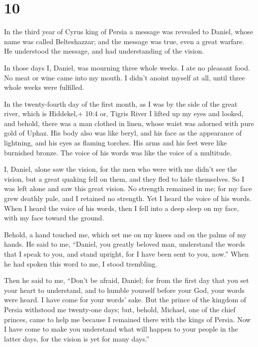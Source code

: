 \hypertarget{section-9}{%
\section{10}\label{section-9}}

 In the third year of Cyrus king of Persia a message was
revealed to Daniel, whose name was called Belteshazzar; and the message
was true, even a great warfare. He understood the message, and had
understanding of the vision.

 In those days I, Daniel, was mourning three whole weeks.
 I ate no pleasant food. No meat or wine came into my mouth.
I didn't anoint myself at all, until three whole weeks were fulfilled.

 In the twenty-fourth day of the first month, as I was by
the side of the great river, which is Hiddekel,+ 10:4 or, Tigris River
 I lifted up my eyes and looked, and behold, there was a man
clothed in linen, whose waist was adorned with pure gold of Uphaz.
 His body also was like beryl, and his face as the
appearance of lightning, and his eyes as flaming torches. His arms and
his feet were like burnished bronze. The voice of his words was like the
voice of a multitude.

 I, Daniel, alone saw the vision, for the men who were with
me didn't see the vision, but a great quaking fell on them, and they
fled to hide themselves.  So I was left alone and saw this
great vision. No strength remained in me; for my face grew deathly pale,
and I retained no strength.  Yet I heard the voice of his
words. When I heard the voice of his words, then I fell into a deep
sleep on my face, with my face toward the ground.

 Behold, a hand touched me, which set me on my knees and on
the palms of my hands.  He said to me, ``Daniel, you
greatly beloved man, understand the words that I speak to you, and stand
upright, for I have been sent to you, now.'' When he had spoken this
word to me, I stood trembling.

 Then he said to me, ``Don't be afraid, Daniel; for from
the first day that you set your heart to understand, and to humble
yourself before your God, your words were heard. I have come for your
words' sake.  But the prince of the kingdom of Persia
withstood me twenty-one days; but, behold, Michael, one of the chief
princes, came to help me because I remained there with the kings of
Persia.  Now I have come to make you understand what will
happen to your people in the latter days, for the vision is yet for many
days.''

